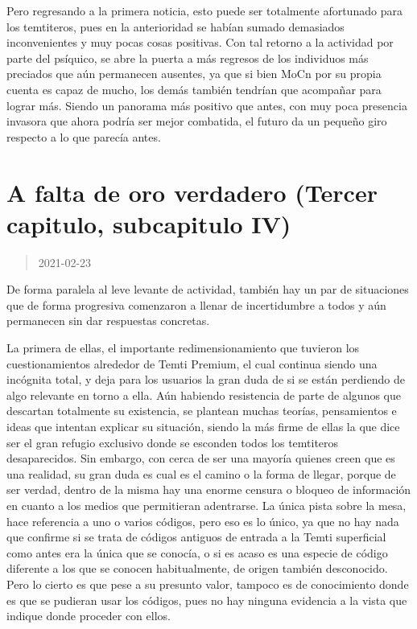 \documentclass[
  spanish,
]{book}
\begin{document}
Pero regresando a la primera noticia, esto puede ser totalmente afortunado para los temtiteros, pues en la anterioridad se habían sumado demasiados inconvenientes y muy pocas cosas positivas. Con tal retorno a la actividad por parte del psíquico, se abre la puerta a más regresos de los individuos más preciados que aún permanecen ausentes, ya que si bien MoCn por su propia cuenta es capaz de mucho, los demás también tendrían que acompañar para lograr más. Siendo un panorama más positivo que antes, con muy poca presencia invasora que ahora podría ser mejor combatida, el futuro da un pequeño giro respecto a lo que parecía antes.

\hypertarget{a-falta-de-oro-verdadero-tercer-capitulo-subcapitulo-iv}{%
\section{A falta de oro verdadero (Tercer capitulo, subcapitulo IV)}\label{a-falta-de-oro-verdadero-tercer-capitulo-subcapitulo-iv}}

\begin{quote}
2021-02-23
\end{quote}

De forma paralela al leve levante de actividad, también hay un par de situaciones que de forma progresiva comenzaron a llenar de incertidumbre a todos y aún permanecen sin dar respuestas concretas.

La primera de ellas, el importante redimensionamiento que tuvieron los cuestionamientos alrededor de Temti Premium, el cual continua siendo una incógnita total, y deja para los usuarios la gran duda de si se están perdiendo de algo relevante en torno a ella.
Aún habiendo resistencia de parte de algunos que descartan totalmente su existencia, se plantean muchas teorías, pensamientos e ideas que intentan explicar su situación, siendo la más firme de ellas la que dice ser el gran refugio exclusivo donde se esconden todos los temtiteros desaparecidos.
Sin embargo, con cerca de ser una mayoría quienes creen que es una realidad, su gran duda es cual es el camino o la forma de llegar, porque de ser verdad, dentro de la misma hay una enorme censura o bloqueo de información en cuanto a los medios que permitieran adentrarse. La única pista sobre la mesa, hace referencia a uno o varios códigos, pero eso es lo único, ya que no hay nada que confirme si se trata de códigos antiguos de entrada a la Temti superficial como antes era la única que se conocía, o si es acaso es una especie de código diferente a los que se conocen habitualmente, de origen también desconocido. Pero lo cierto es que pese a su presunto valor, tampoco es de conocimiento donde es que se pudieran usar los códigos, pues no hay ninguna evidencia a la vista que indique donde proceder con ellos.
\end{document}
